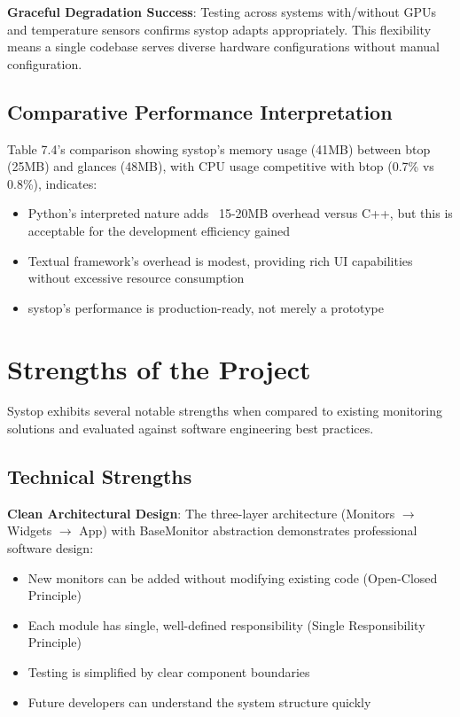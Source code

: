 \documentclass[12pt,a4paper,oneside]{report}
\begin{document}
\textbf{Graceful Degradation Success}: Testing across systems with/without GPUs and temperature sensors confirms systop adapts appropriately. This flexibility means a single codebase serves diverse hardware configurations without manual configuration.

\subsection{Comparative Performance Interpretation}

Table 7.4's comparison showing systop's memory usage (41MB) between btop (25MB) and glances (48MB), with CPU usage competitive with btop (0.7\% vs 0.8\%), indicates:

\begin{itemize}
    \item Python's interpreted nature adds ~15-20MB overhead versus C++, but this is acceptable for the development efficiency gained
    \item Textual framework's overhead is modest, providing rich UI capabilities without excessive resource consumption
    \item systop's performance is production-ready, not merely a prototype
\end{itemize}

\section{Strengths of the Project}
\label{sec:strengths}

Systop exhibits several notable strengths when compared to existing monitoring solutions and evaluated against software engineering best practices.

\subsection{Technical Strengths}

\textbf{Clean Architectural Design}: The three-layer architecture (Monitors $\rightarrow$ Widgets $\rightarrow$ App) with BaseMonitor abstraction demonstrates professional software design:
\begin{itemize}
    \item New monitors can be added without modifying existing code (Open-Closed Principle)
    \item Each module has single, well-defined responsibility (Single Responsibility Principle)
    \item Testing is simplified by clear component boundaries
    \item Future developers can understand the system structure quickly
\end{itemize}
\end{document}
